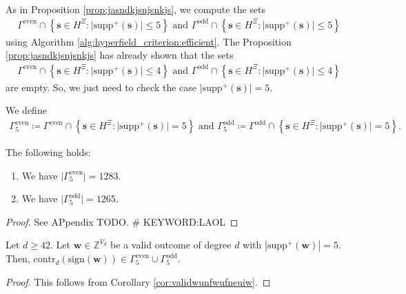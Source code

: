 As in Proposition \ref{prop:jasndkjsnjsnkjs}, we compute the sets 
\begin{gather*}
    \Gamma^{\mathrm{even}} \cap \left\{ \mathbf{s} \in H^{\Xi} : \lvert \mathrm{supp}^+(\mathbf{s}) \rvert \leq 5 \right\} \text{ and }
    \Gamma^{\mathrm{odd}} \cap \left\{ \mathbf{s} \in H^{\Xi} : \lvert \mathrm{supp}^+(\mathbf{s}) \rvert \leq 5 \right\} 
\end{gather*}
using Algorithm \ref{alg:hyperfield_criterion:efficient}. The Proposition \ref{prop:jasndkjsnjsnkjs} has already shown that the sets 
\begin{align*}
    \Gamma^{\mathrm{even}} \cap \left\{ \mathbf{s} \in H^{\Xi} : \lvert \mathrm{supp}^+(\mathbf{s}) \rvert \leq 4 \right\} \text{ and }
    \Gamma^{\mathrm{odd}} \cap \left\{ \mathbf{s} \in H^{\Xi} : \lvert \mathrm{supp}^+(\mathbf{s}) \rvert \leq 4 \right\} 
\end{align*}
are empty. So, we just need to check the case \( \lvert \mathrm{supp}^+(\mathbf{s}) \rvert = 5 \).



\begin{definition}
    We define 
    \begin{gather*}
        \Gamma^{\mathrm{even}}_5 \coloneqq \Gamma^{\mathrm{even}} \cap \left\{ \mathbf{s} \in H^{\Xi} : \lvert \mathrm{supp}^+(\mathbf{s}) \rvert = 5 \right\}
        \text{ and }
        \Gamma^{\mathrm{odd}}_5 \coloneqq \Gamma^{\mathrm{odd}} \cap \left\{ \mathbf{s} \in H^{\Xi} : \lvert \mathrm{supp}^+(\mathbf{s}) \rvert = 5 \right\}.
    \end{gather*}
\end{definition}

\begin{proposition}
    The following holds:
    \begin{enumerate}
        \item We have \( \lvert \Gamma^{\mathrm{even}}_5 \rvert  = 1283\).
        \item We have \( \lvert \Gamma^{\mathrm{odd}}_5 \rvert  = 1265\).
    \end{enumerate}
\end{proposition}

\begin{proof}
    See APpendix TODO. \# KEYWORD:LAOL
\end{proof}

\begin{corollary}
    Let \( d\geq 42 \). Let \( \mathbf{w} \in \mathbb{Z}^{V_d} \) be a valid outcome of degree \( d \) with \( |\mathrm{supp}^+(\mathbf w)| = 5 \). Then, \( \mathrm{contr}_d(\mathrm{sign}(\mathbf{w})) \in \Gamma^{\mathrm{even}}_5 \cup \Gamma^{\mathrm{odd}}_5 \).
\end{corollary}

\begin{proof}
    This follows from Corollary \ref{cor:validwunfwufneuiw}.
\end{proof}